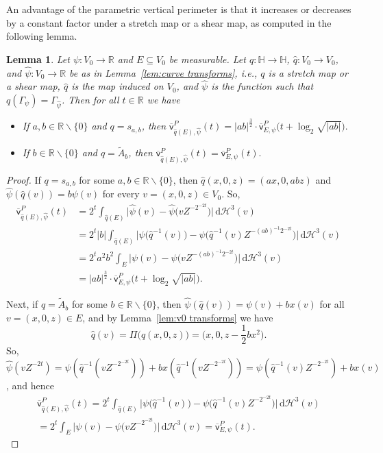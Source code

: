 \documentclass[11pt,reqno]{amsart}
\renewcommand{\H}{\mathbb{H}}
\newcommand{\R}{\mathbb{R}}
\newcommand{\cH}{\mathcal{H}}
\newcommand{\ud}[0]{\,\mathrm{d}}
\newcommand{\0}{\mathbf{0}}
\renewcommand{\1}{\mathbf 1}
\newcommand{\from}{\colon}
\renewcommand{\subset}{\subseteq}
\renewcommand{\setminus}{\smallsetminus}
\newtheorem{lemma}[thm]{Lemma}
\theoremstyle{remark}
\newcommand{\vpP}[1]{{\overline{\mathsf{v}}^{P}_{\!#1}}}
\begin{document}
An advantage of the parametric vertical perimeter is that it increases or decreases by a constant factor under a stretch map or a shear map, as computed in the following lemma.
\begin{lemma}\label{lem:pvp is invariant}
  Let $\psi\from V_0\to \R$ and  $E\subset V_0$  be  measurable.  Let $q\from \H\to \H$, $\hat{q}\from V_0\to V_0$, and $\hat{\psi}\from V_0\to \R$ be as in Lemma~\ref{lem:curve transforms}, i.e., $q$ is a stretch map or a shear map, $\hat{q}$ is the map induced on $V_0$, and $\hat{\psi}$ is the function such that $q(\Gamma_\psi)=\Gamma_{\hat{\psi}}$. Then for all $t\in \R$ we have
\begin{itemize}
 \item  If $a, b\in \R\setminus \{0\}$ and $q=s_{a,b}$, then
  $\vpP{\hat{q}(E),\hat{\psi}}(t)=|ab|^{\frac{3}{2}}\cdot\vpP{E,\psi}\Big(t+\log_2\sqrt{|ab|}\Big).$
\item   If $b\in \R\setminus\{0\}$ and $q=\tilde{A}_b$, then
  $\vpP{\hat{q}(E),\hat{\psi}}(t)=\vpP{E,\psi}(t).$
  \end{itemize}
\end{lemma}
\begin{proof}
  If   $q=s_{a,b}$ for some $a, b\in \R\setminus \{0\}$, then   $\hat{q}(x,0,z)=(ax,0, abz)$ and $\hat{\psi}(\hat{q}(v))=b \psi(v)$ for every $v=(x,0,z)\in V_0$. So,
  \begin{align*}
    \vpP{\hat{q}(E),\hat{\psi}}(t)
    &=2^t\int_{\hat{q}(E)} \big|\hat{\psi}(v)-\hat{\psi}\big(v Z^{-2^{-2t}}\big)\big| \ud \cH^3(v)\\
    &=2^t |b| \int_{\hat{q}(E)} \big|\psi\big(\hat{q}^{-1}(v)\big)-\psi\big(\hat{q}^{-1}(v) Z^{-(ab)^{-1}2^{-2t}}\big)\big| \ud \cH^3(v)\\
    &=2^t a^2b^2 \int_{E} \big|\psi(v)-\psi\big(v Z^{-(ab)^{-1}2^{-2t}}\big)\big| \ud \cH^3(v)\\
    &=|ab|^{\frac{3}{2}}\cdot\vpP{E,\psi}\Big(t+\log_2\sqrt{|ab|}\Big).
  \end{align*}

 Next, if $q=\tilde{A}_b$ for some $b\in \R\setminus \{0\}$, then $\hat{\psi}(\hat{q}(v))=\psi(v)+bx(v)$ for all $v=(x,0,z)\in E$, and by Lemma~\ref{lem:v0 transforms} we have
  $$\hat{q}(v)=\Pi\big(q(x,0,z)\big)=\big(x,0,z-\frac12 bx^2\big).$$
 So, $\hat{\psi}(vZ^{-2t})=\psi(\hat{q}^{-1}(vZ^{-2^{-2t}}))+bx(\hat{q}^{-1}(vZ^{-2^{-2t}}))=\psi(\hat{q}^{-1}(v)Z^{-2^{-2t}})+bx(v)$, and hence
  \begin{multline*}
    \vpP{\hat{q}(E),\hat{\psi}}(t)
    =2^t \int_{\hat{q}(E)} \big|\psi\big(\hat{q}^{-1}(v)\big)-\psi\big(\hat{q}^{-1}(v) Z^{-2^{-2t}}\big)\big| \ud \cH^3(v)\\
    =2^t \int_{E} \big|\psi(v)-\psi\big(v Z^{-2^{-2t}}\big)\big| \ud\cH^3(v)
    =\vpP{E,\psi}(t).\tag*{\qedhere}
  \end{multline*}
\end{proof}
\end{document}
